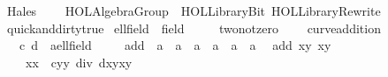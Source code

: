 %
\begin{isabellebody}%
%
%
\isadelimtheory
%
\endisadelimtheory
%
\isatagtheory
{}\isamarkupfalse%
\ Hales\isanewline
\ \ \ \ {\isachardoublequoteopen}HOL{\isacharminus}Algebra{\isachardot}Group{\isachardoublequoteclose}\ \ {\isachardoublequoteopen}HOL{\isacharminus}Library{\isachardot}Bit{\isachardoublequoteclose}\ {\isachardoublequoteopen}HOL{\isacharminus}Library{\isachardot}Rewrite{\isachardoublequoteclose}\isanewline
{}%
\endisatagtheory
{\isafoldtheory}%
%
\isadelimtheory
\isanewline
%
\endisadelimtheory
\isanewline
{}\isamarkupfalse%
\ {\isacharbrackleft}{\isacharbrackleft}quick{\isacharunderscore}and{\isacharunderscore}dirty{\isacharequal}true{\isacharbrackright}{\isacharbrackright}%
\isadelimdocument
%
\endisadelimdocument
%
\isatagdocument
%
\isamarkuptrue%
%
\endisatagdocument
{\isafolddocument}%
%
\isadelimdocument
%
\endisadelimdocument
{}\isamarkupfalse%
\ ell{\isacharunderscore}field\ {\isacharequal}\ field\ {\isacharplus}\ \isanewline
\ \ \ two{\isacharunderscore}not{\isacharunderscore}zero{\isacharcolon}\ {\isachardoublequoteopen}{}\ {\isasymnoteq}\ {}{\isachardoublequoteclose}\isanewline
\isanewline
{}\isamarkupfalse%
\ curve{\isacharunderscore}addition\ {\isacharequal}\ \ \isanewline
\ \ \ c\ d\ {\isacharcolon}{\isacharcolon}\ {\isachardoublequoteopen}{\isacharprime}a{\isacharcolon}{\isacharcolon}ell{\isacharunderscore}field{\isachardoublequoteclose}\isanewline
{}\ \ \ \isanewline
\isanewline
{}\isamarkupfalse%
\ add\ {\isacharcolon}{\isacharcolon}\ {\isachardoublequoteopen}{\isacharprime}a\ {\isasymtimes}\ {\isacharprime}a\ {\isasymRightarrow}\ {\isacharprime}a\ {\isasymtimes}\ {\isacharprime}a\ {\isasymRightarrow}\ {\isacharprime}a\ {\isasymtimes}\ {\isacharprime}a{\isachardoublequoteclose}\ \isanewline
\ {\isachardoublequoteopen}add\ {\isacharparenleft}xy\ {\isacharparenleft}xy\ {\isacharequal}\isanewline
\ \ \ \ {\isacharparenleft}{\isacharparenleft}xx\ {\isacharminus}\ c{\isacharasterisk}yy\ div\ {\isacharparenleft}{}{\isacharminus}d{\isacharasterisk}xyxy\ \isanewline

\end{isabellebody}
